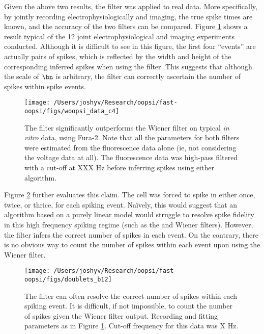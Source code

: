Given the above two results, the \foopsi filter was applied to real data.  More specifically, by jointly recording electrophysiologically and imaging, the true spike times are known, and the accuracy of the two filters can be compared.  Figure \ref{fig:woopsi_data} shows a result typical of the 12 joint electrophysiological and imaging experiments conducted. Although it is difficult to see in this figure, the first four ``events'' are actually pairs of spikes, which is reflected by the width and height of the corresponding inferred spikes when using the \foopsi filter. %
This suggests that although the scale of $\bn$ is arbitrary, the \foopsi filter can correctly ascertain the number of spikes within spike events.  

\begin{figure}[h!]
\centering \texttt{[image: /Users/joshyv/Research/oopsi/fast-oopsi/figs/woopsi\_data\_c4]}
\caption[\foopsi filter outperforms Wiener filter on real data]{The \foopsi filter significantly outperforms the Wiener filter on typical \emph{in vitro} data, using Fura-2. Note that all the parameters for both filters were estimated from the fluorescence data alone (ie, not considering the voltage data at all).  The fluorescence data was high-pass filtered with a cut-off at XXX Hz before inferring spikes using either algorithm.} \label{fig:woopsi_data}
\end{figure}

Figure \ref{fig:woopsi_data_doublets} further evaluates this claim.  The cell was forced to spike in either once, twice, or thrice, for each spiking event.  Na\"{i}vely, this would suggest that an algorithm based on a purely linear model would struggle to resolve spike fidelity in this high frequency spiking regime (such as the \foopsi and Wiener filters).  However, the \foopsi filter infers the correct number of spikes in each event.  On the contrary, there is no obvious way to count the number of spikes within each event upon using the Wiener filter.

\begin{figure}[h!]
\centering \texttt{[image: /Users/joshyv/Research/oopsi/fast-oopsi/figs/doublets\_b12]}
\caption[\foopsi filter outperforms Wiener filter on doublets]{The \foopsi filter can often resolve the correct number of spikes within each spiking event.  It is difficult, if not impossible, to count the number of spikes given the Wiener filter output.  Recording and fitting parameters as in Figure \ref{fig:woopsi_data}. Cut-off frequency for this data was X Hz. } \label{fig:woopsi_data_doublets}
\end{figure}






